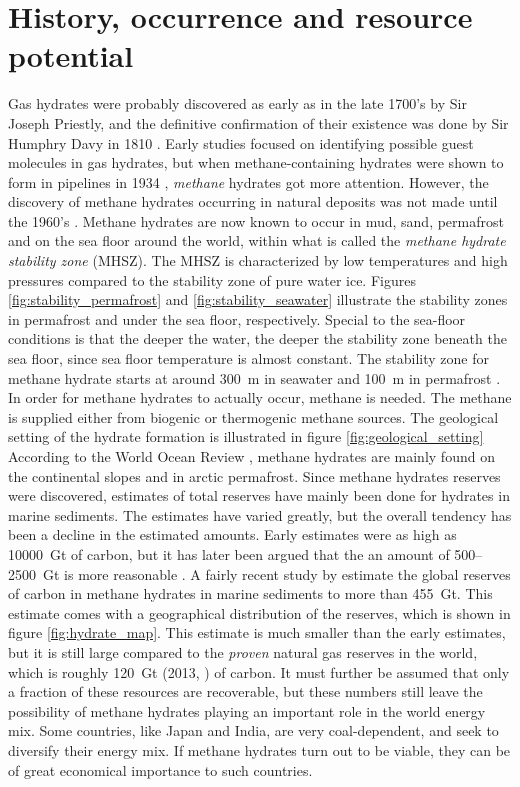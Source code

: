 \section{History, occurrence and resource potential}
Gas hydrates were probably discovered as early as in the late 1700's by Sir Joseph Priestly, and the definitive confirmation of their existence was done by Sir Humphry Davy in 1810 \cite{Hester2009}. Early studies focused on identifying possible guest molecules in gas hydrates, but when methane-containing hydrates were shown to form in pipelines in 1934 \cite{Hammerschmidt1934}, \emph{methane} hydrates got more attention. However, the discovery of methane hydrates occurring in natural deposits was not made until the 1960's \cite{Makogon200714}. Methane hydrates are now known to occur in mud, sand, permafrost and on the sea floor around the world, within what is called the \emph{methane hydrate stability zone} (MHSZ). The MHSZ is characterized by low temperatures and high pressures compared to the stability zone of pure water ice. Figures \ref{fig:stability_permafrost} and \ref{fig:stability_seawater} illustrate the stability zones in permafrost and under the sea floor, respectively. Special to the sea-floor conditions is that the deeper the water, the deeper the stability zone beneath the sea floor, since sea floor temperature is almost constant. The stability zone for methane hydrate starts at around \SI{300}{\meter} in seawater and \SI{100}{\meter} in permafrost \cite{Hester2009}. In order for methane hydrates to actually occur, methane is needed. The methane is supplied either from biogenic or thermogenic methane sources. The geological setting of the hydrate formation is illustrated in figure \ref{fig:geological_setting} According to the World Ocean Review \cite{Bucker2014}, methane hydrates are mainly found on the continental slopes and in arctic permafrost.  Since methane hydrates reserves were discovered, estimates of total reserves have mainly been done for hydrates in marine sediments. The estimates have varied greatly, but the overall tendency has been a decline in the estimated amounts. Early estimates were as high as \SI{10000}{\giga\tonne} of carbon, but it has later been argued that the an amount of 500–\SI{2500}{\giga\tonne} is more reasonable \cite{Milkov2004183}. A fairly recent study by \citet{Wallmann2012} estimate the global reserves of carbon in methane hydrates in marine sediments to more than \SI{455}{\giga\tonne}. This estimate comes with a geographical distribution of the reserves, which is shown in figure \ref{fig:hydrate_map}. This estimate is much smaller than the early estimates, but it is still large compared to the \emph{proven} natural gas reserves in the world, which is roughly \SI{120}{\giga\tonne} (2013, \cite{CIA2013}) of carbon. It must further be assumed that only a fraction of these resources are recoverable, but these numbers still leave the possibility of methane hydrates playing an important role in the world energy mix. Some countries, like Japan and India, are very coal-dependent, and seek to diversify their energy mix. If methane hydrates turn out to be viable, they can be of great economical importance to such countries. 



